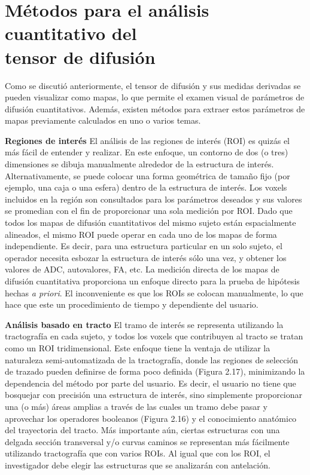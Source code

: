 \documentclass[12pt,a5,twoside]{book}
\begin{document}
\section{Métodos para el análisis cuantitativo del\\ tensor de difusión}

Como se discutió anteriormente, el tensor de difusión y sus medidas derivadas se pueden visualizar como mapas, lo que permite el examen visual de parámetros de difusión cuantitativos. Además, existen métodos para extraer estos parámetros de mapas previamente calculados en uno o varios temas.

\textbf {Regiones de interés} El análisis de las regiones de interés (ROI) es quizás el más fácil de entender y realizar. En este enfoque, un contorno de dos (o tres) dimensiones se dibuja manualmente alrededor de la estructura de interés. Alternativamente, se puede colocar una forma geométrica de tamaño fijo (por ejemplo, una caja o una esfera) dentro de la estructura de interés. Los voxels incluidos en la región son consultados para los parámetros deseados y sus valores se promedian con el fin de proporcionar una sola medición por ROI. Dado que todos los mapas de difusión cuantitativos del mismo sujeto están espacialmente alineados, el mismo ROI puede operar en cada uno de los mapas de forma independiente. Es decir, para una estructura particular en un solo sujeto, el operador necesita esbozar la estructura de interés sólo una vez, y obtener los valores de ADC, autovalores, FA, etc. La medición directa de los mapas de difusión cuantitativa proporciona un enfoque directo para la prueba de hipótesis hechas {\it a priori}. El inconveniente es que los ROIs se colocan manualmente, lo que hace que este un procedimiento de tiempo y dependiente del usuario.

\textbf{Análisis basado en tracto} El tramo de interés se representa utilizando la tractografía en cada sujeto, y todos los voxels que contribuyen al tracto se tratan como un ROI tridimensional. Este enfoque tiene la ventaja de utilizar la naturaleza semi-automatizada de la tractografía, donde las regiones de selección de trazado pueden definirse de forma poco definida (Figura 2.17), minimizando la dependencia del método por parte del usuario. Es decir, el usuario no tiene que bosquejar con precisión una estructura de interés, sino simplemente proporcionar una (o más) áreas amplias a través de las cuales un tramo debe pasar y aprovechar los operadores booleanos (Figura 2.16) y el conocimiento anatómico del trayectoria del tracto. Más importante aún, ciertas estructuras con una delgada sección transversal y/o curvas caminos se representan más fácilmente utilizando tractografía que con varios ROIs. Al igual que con los ROI, el investigador debe elegir las estructuras que se analizarán con antelación.
\end{document}
